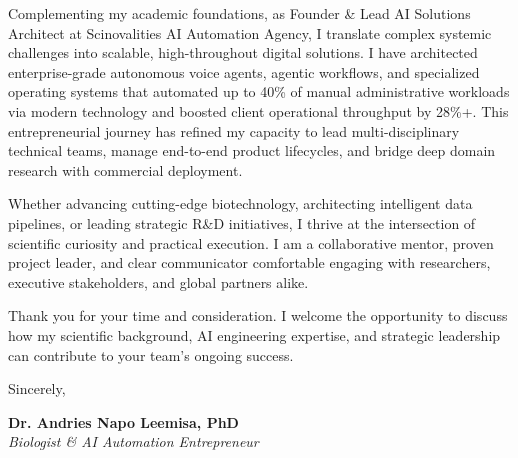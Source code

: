 \documentclass[11pt,a4paper]{article}
\begin{document}
Complementing my academic foundations, as Founder \& Lead AI Solutions Architect at Scinovalities AI Automation Agency, I translate complex systemic challenges into scalable, high-throughout digital solutions. I have architected enterprise-grade autonomous voice agents, agentic workflows, and specialized operating systems that automated up to 40\% of manual administrative workloads via modern technology and boosted client operational throughput by 28\%+. This entrepreneurial journey has refined my capacity to lead multi-disciplinary technical teams, manage end-to-end product lifecycles, and bridge deep domain research with commercial deployment.

Whether advancing cutting-edge biotechnology, architecting intelligent data pipelines, or leading strategic R\&D initiatives, I thrive at the intersection of scientific curiosity and practical execution. I am a collaborative mentor, proven project leader, and clear communicator comfortable engaging with researchers, executive stakeholders, and global partners alike.

Thank you for your time and consideration. I welcome the opportunity to discuss how my scientific background, AI engineering expertise, and strategic leadership can contribute to your team's ongoing success.

\vspace{12pt}
Sincerely,

\vspace{12pt}
\textbf{\large Dr. Andries Napo Leemisa, PhD} \\
\textit{\color{textgray} Biologist \& AI Automation Entrepreneur}
\end{document}

